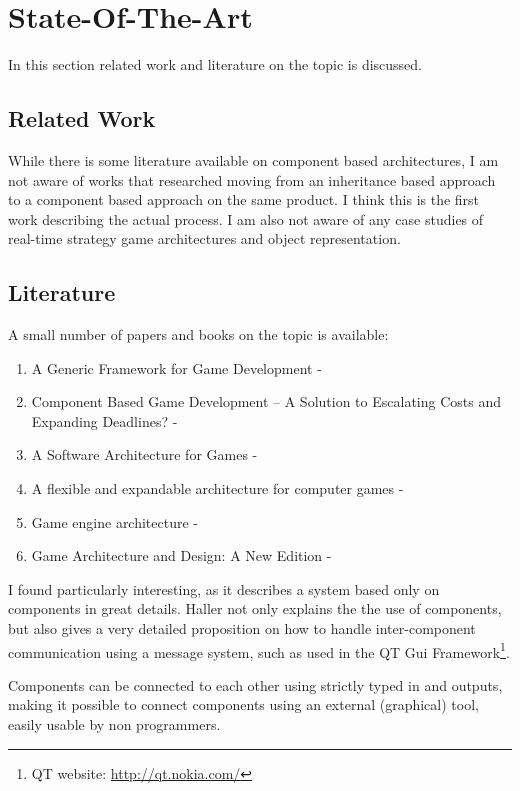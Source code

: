 \section{State-Of-The-Art}
In this section related work and literature on the topic is discussed.

\subsection{Related Work}
While there is some literature available on component based architectures, I am not aware of works that researched
moving from an inheritance based approach to a component based approach on the same product. I think this is the first
work describing the actual process. I am also not aware of any case studies of \OS{} real-time strategy game
architectures and object representation.

\subsection{Literature}
A small number of papers and books on the topic is available:
\begin{enumerate}
    \item A Generic Framework for Game Development - \cite{Fh02ageneric}
    \item Component Based Game Development – A Solution to Escalating Costs and Expanding Deadlines? - \cite{springerlink:10.1007/978-3-540-73551-95}
    \item A Software Architecture for Games - \cite{Doherty_2003}
    \item A flexible and expandable architecture for computer games - \cite{Plummer_2004}
    \item Game engine architecture - \cite{Gregory.2009}
    \item Game Architecture and Design: A New Edition - \cite{Rollings.2003}
\end{enumerate}

I found \citet{Fh02ageneric} particularly interesting, as it describes a system based only on components in great
details. Haller not only explains the the use of components, but also gives a very detailed proposition on how to handle
inter-component communication using a message system, such as used in the QT Gui Framework\footnote{QT website:
\url{http://qt.nokia.com/}}.

Components can be connected to each other using strictly typed in and outputs, making it possible to connect components
using an external (graphical) tool, easily usable by non programmers.

